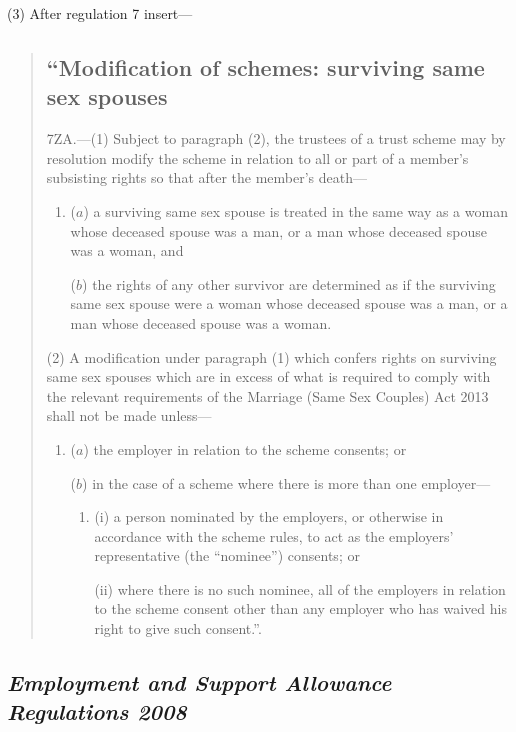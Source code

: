 \documentclass[12pt,a4paper]{article}
\begin{document}
(3) After regulation 7 insert—
\begin{quotation}
\subsection*{“Modification of schemes: surviving same sex spouses}

7ZA.—(1) Subject to paragraph (2), the trustees of a trust scheme may by resolution modify the scheme in relation to all or part of a member’s subsisting rights so that after the member’s death—
\begin{enumerate}\item[]
($a$) a surviving same sex spouse is treated in the same way as a woman whose deceased spouse was a man, or a man whose deceased spouse was a woman, and

($b$) the rights of any other survivor are determined as if the surviving same sex spouse were a woman whose deceased spouse was a man, or a man whose deceased spouse was a woman.
\end{enumerate}

(2) A modification under paragraph (1) which confers rights on surviving same sex spouses which are in excess of what is required to comply with the relevant requirements of the Marriage (Same Sex Couples) Act 2013 shall not be made unless—
\begin{enumerate}\item[]
($a$) the employer in relation to the scheme consents; or

($b$) in the case of a scheme where there is more than one employer—
\begin{enumerate}\item[]
(i) a person nominated by the employers, or otherwise in accordance with the scheme rules, to act as the employers’ representative (the “nominee”) consents; or

(ii) where there is no such nominee, all of the employers in relation to the scheme consent other than any employer who has waived his right to give such consent.”.
\end{enumerate}
\end{enumerate}
\end{quotation}

\subsection*{\itshape Employment and Support Allowance Regulations 2008}
\end{document}
